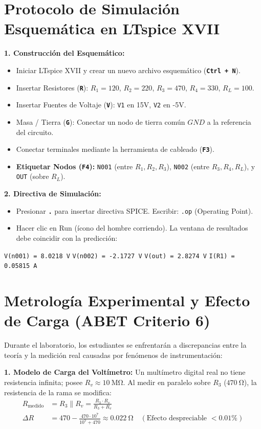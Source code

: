 \documentclass[11pt, a4paper]{article}
\newcommand{\tecla}[1]{\colorbox{gray!20}{\texttt{\textbf{#1}}}} %
\begin{document}
\section{Protocolo de Simulación Esquemática en LTspice XVII}
\textbf{1. Construcción del Esquemático:}
\begin{itemize}[itemsep=1pt]
    \item Iniciar LTspice XVII y crear un nuevo archivo esquemático (\tecla{Ctrl + N}).
    \item Insertar Resistores (\tecla{R}): $R_1 = 120$, $R_2 = 220$, $R_3 = 470$, $R_4 = 330$, $R_L = 100$.
    \item Insertar Fuentes de Voltaje (\tecla{V}): \texttt{V1} en 15V, \texttt{V2} en -5V.
    \item Masa / Tierra (\tecla{G}): Conectar un nodo de tierra común $GND$ a la referencia del circuito.
    \item Conectar terminales mediante la herramienta de cableado (\tecla{F3}).
    \item \textbf{Etiquetar Nodos (\tecla{F4}):} \texttt{N001} (entre $R_1,R_2,R_3$), \texttt{N002} (entre $R_3,R_4,R_L$), y \texttt{OUT} (sobre $R_L$).
\end{itemize}

\textbf{2. Directiva de Simulación:}
\begin{itemize}[itemsep=1pt]
    \item Presionar \tecla{.} para insertar directiva SPICE. Escribir: \texttt{.op} (Operating Point).
    \item Hacer clic en Run (ícono del hombre corriendo). La ventana de resultados debe coincidir con la predicción:
\end{itemize}
\begin{center}
    \texttt{V(n001) = 8.0218 V} \quad \texttt{V(n002) = -2.1727 V} \quad \texttt{V(out) = 2.8274 V} \quad \texttt{I(R1) = 0.05815 A}
\end{center}

\section{Metrología Experimental y Efecto de Carga (ABET Criterio 6)}
Durante el laboratorio, los estudiantes se enfrentarán a discrepancias entre la teoría y la medición real causadas por fenómenos de instrumentación:

\textbf{1. Modelo de Carga del Voltímetro:}
Un multímetro digital real no tiene resistencia infinita; posee $R_v \approx \qty{10}{\mega\ohm}$. Al medir en paralelo sobre $R_3$ ($\qty{470}{\ohm}$), la resistencia de la rama se modifica:
\begin{align*}
    R_{\text{medido}} &= R_3 \parallel R_v = \frac{R_3 \cdot R_v}{R_3 + R_v} \\
    \Delta R &= 470 - \frac{470 \cdot 10^7}{10^7 + 470} \approx \qty{0.022}{\ohm} \quad (\text{Efecto despreciable } < 0.01\%)
\end{align*}
\end{document}
